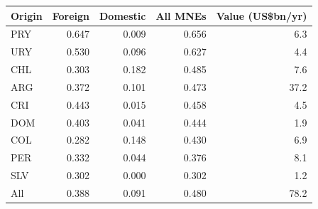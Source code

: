 \begin{tabular}{lrrrr}
\toprule
Origin & Foreign & Domestic & All MNEs & Value (US\$bn/yr) \\
\midrule
PRY & 0.647 & 0.009 & 0.656 & 6.3 \\
URY & 0.530 & 0.096 & 0.627 & 4.4 \\
CHL & 0.303 & 0.182 & 0.485 & 7.6 \\
ARG & 0.372 & 0.101 & 0.473 & 37.2 \\
CRI & 0.443 & 0.015 & 0.458 & 4.5 \\
DOM & 0.403 & 0.041 & 0.444 & 1.9 \\
COL & 0.282 & 0.148 & 0.430 & 6.9 \\
PER & 0.332 & 0.044 & 0.376 & 8.1 \\
SLV & 0.302 & 0.000 & 0.302 & 1.2 \\
\midrule
All & 0.388 & 0.091 & 0.480 & 78.2 \\
\bottomrule
\end{tabular}
